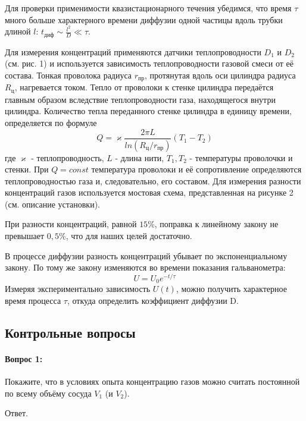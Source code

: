 \documentclass[a4paper,12pt]{article} %
\begin{document}
Для проверки применимости квазистационарного течения убедимся, что время $\tau$ много больше характерного времени диффузии одной частицы вдоль трубки длиной $l$: $t_{\text{диф}} \sim \frac{l^2}{D} \ll \tau$.

 Для измерения концентраций применяются датчики теплопроводности $D_1$ и $D_2$ (см. рис. 1) и используется зависимость теплопроводности газовой смеси от её состава. Тонкая проволока радиуса $r_{\text{пр}}$, протянутая вдоль оси цилиндра радиуса $R_{\text{ц}}$, нагревается током. Тепло от проволоки к стенке цилиндра передаётся главным образом вследствие теплопроводности газа, находящегося внутри цилиндра. Количество тепла переданного стенке цилиндра в единицу времени, определяется по формуле 
\begin{equation}
Q = \varkappa \frac{2\pi L}{ln (R_{\text{ц}}/r_{\text{пр}})}(T_1-T_2)
\end{equation}
где $\varkappa$ - теплопроводность, $L$ - длина нити, $T_1, T_2$ - температуры проволочки и стенки. При $Q = const$ температура проволоки и её сопротивление определяются теплопроводностью газа и, следовательно, его составом. Для измерения разности концентраций газов используется  
мостовая схема, представленная на рисунке 2 (см. описание установки).
	 
	 При разности концентраций, равной $15\%$, поправка к линейному закону не превышает $0,5\%$, что для наших целей достаточно.
	 
 В процессе диффузии разность концентраций убывает по экспоненциальному закону. По тому же закону изменяются во времени показания гальванометра:
\begin{equation}
U = U_0e^{-t/\tau} \label{voltage}
\end{equation}
Измеряя экспериментально зависимость $U(t)$, можно получить характерное время процесса $\tau$, откуда определить коэффициент диффузии D.



\subsection{Контрольные вопросы}

\paragraph{Вопрос 1:}
Покажите, что в условиях опыта концентрацию газов можно считать постоянной по всему объёму сосуда $V_1$ (и $V_2$).

Ответ.
\end{document}
